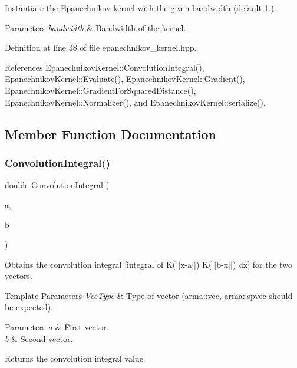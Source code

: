 Instantiate the Epanechnikov kernel with the given bandwidth (default 1.). 


\begin{DoxyParams}{Parameters}
{\em bandwidth} & Bandwidth of the kernel. \\
\hline
\end{DoxyParams}


Definition at line 38 of file epanechnikov\+\_\+kernel.\+hpp.



References Epanechnikov\+Kernel\+::\+Convolution\+Integral(), Epanechnikov\+Kernel\+::\+Evaluate(), Epanechnikov\+Kernel\+::\+Gradient(), Epanechnikov\+Kernel\+::\+Gradient\+For\+Squared\+Distance(), Epanechnikov\+Kernel\+::\+Normalizer(), and Epanechnikov\+Kernel\+::serialize().



\subsection{Member Function Documentation}
\mbox{\label{classmlpack_1_1kernel_1_1EpanechnikovKernel_af3077f924263d1932950f4f7176c93eb}} 
\subsubsection{Convolution\+Integral()}
{\footnotesize\ttfamily double Convolution\+Integral (\begin{DoxyParamCaption}\item[{const Vec\+TypeA \&}]{a,  }\item[{const Vec\+TypeB \&}]{b }\end{DoxyParamCaption})}



Obtains the convolution integral [integral of K($\vert$$\vert$x-\/a$\vert$$\vert$) K($\vert$$\vert$b-\/x$\vert$$\vert$) dx] for the two vectors. 


\begin{DoxyTemplParams}{Template Parameters}
{\em Vec\+Type} & Type of vector (arma\+::vec, arma\+::spvec should be expected). \\
\hline
\end{DoxyTemplParams}

\begin{DoxyParams}{Parameters}
{\em a} & First vector. \\
\hline
{\em b} & Second vector. \\
\hline
\end{DoxyParams}
\begin{DoxyReturn}{Returns}
the convolution integral value. 
\end{DoxyReturn}


